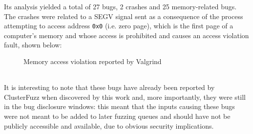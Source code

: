 Its analysis yielded a total of 27 bugs, 2 crashes and 25 memory-related bugs.
The crashes were related to a SEGV signal sent as a consequence of the process attempting to access address \verb|0x0| (i.e. zero page), which is the first page of a computer's memory and whose access is prohibited and causes an access violation fault, shown below:
\begin{figure}[h]
\caption{Memory access violation reported by Valgrind}
\label{fig:segv_gpac}
\end{figure}
\ \\

It is interesting to note that these bugs have already been reported by ClusterFuzz when discovered by this work and, more importantly, they were still in the bug disclosure windows: this meant that the inputs causing these bugs were not meant to be added to later fuzzing queues and should have not be publicly accessible and available, due to obvious security implications.

